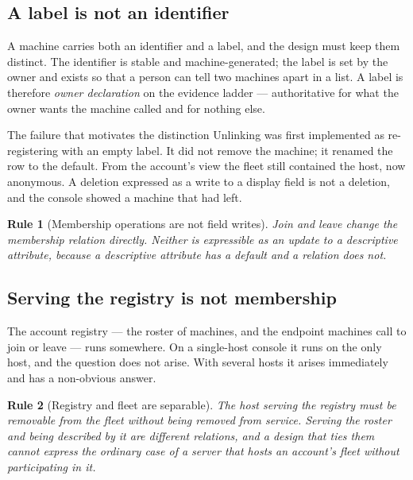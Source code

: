 \documentclass[11pt]{article}
\newtheorem{drule}{Rule}
\begin{document}
\subsection{A label is not an identifier}

A machine carries both an identifier and a label, and the design must keep them distinct. The identifier is stable and machine-generated; the label is set by the owner and exists so that a person can tell two machines apart in a list. A label is therefore \emph{owner declaration} on the evidence ladder --- authoritative for what the owner wants the machine called and for nothing else.

\begin{cautionbox}{The failure that motivates the distinction}
Unlinking was first implemented as re-registering with an empty label. It did not remove the machine; it renamed the row to the default. From the account's view the fleet still contained the host, now anonymous. A deletion expressed as a write to a display field is not a deletion, and the console showed a machine that had left.
\end{cautionbox}

\begin{drule}[Membership operations are not field writes]
\label{rule:membership}
Join and leave change the membership relation directly. Neither is expressible as an update to a descriptive attribute, because a descriptive attribute has a default and a relation does not.
\end{drule}

\subsection{Serving the registry is not membership}

The account registry --- the roster of machines, and the endpoint machines call to join or leave --- runs somewhere. On a single-host console it runs on the only host, and the question does not arise. With several hosts it arises immediately and has a non-obvious answer.

\begin{drule}[Registry and fleet are separable]
\label{rule:registry}
The host serving the registry must be removable from the fleet without being removed from service. Serving the roster and being described by it are different relations, and a design that ties them cannot express the ordinary case of a server that hosts an account's fleet without participating in it.
\end{drule}
\end{document}
